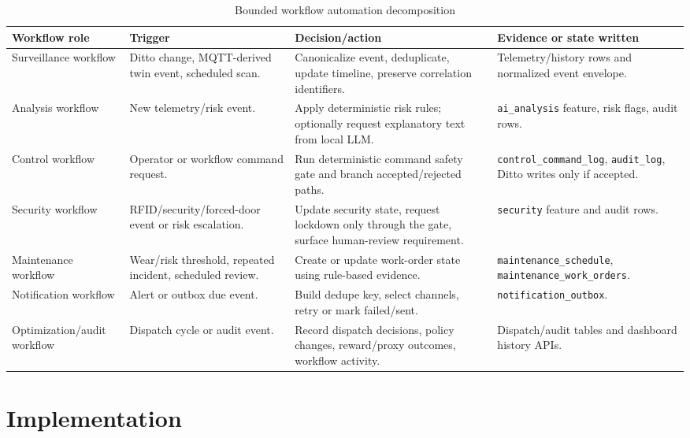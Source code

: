 \documentclass[journal]{IEEEtran}
\newcommand{\toprule}{\hline}
\newcommand{\midrule}{\hline}
\newcommand{\bottomrule}{\hline}
\newcommand{\artifact}[1]{\texttt{#1}}
\begin{document}
\begin{table}[t]
\caption{Bounded workflow automation decomposition}
\label{tab:agent-workflows}
\centering
\footnotesize
\begin{tabularx}{\textwidth}{@{}p{}p{}Yp{0.18\textwidth}@{}}
\toprule
Workflow role & Trigger & Decision/action & Evidence or state written \\
\midrule
Surveillance workflow & Ditto change, MQTT-derived twin event, scheduled scan. & Canonicalize event, deduplicate, update timeline, preserve correlation identifiers. & Telemetry/history rows and normalized event envelope. \\
Analysis workflow & New telemetry/risk event. & Apply deterministic risk rules; optionally request explanatory text from local LLM. & \artifact{ai\_analysis} feature, risk flags, audit rows. \\
Control workflow & Operator or workflow command request. & Run deterministic command safety gate and branch accepted/rejected paths. & \artifact{control\_\allowbreak command\_\allowbreak log}, \artifact{audit\_log}, Ditto writes only if accepted. \\
Security workflow & RFID/security/forced-door event or risk escalation. & Update security state, request lockdown only through the gate, surface human-review requirement. & \artifact{security} feature and audit rows. \\
Maintenance workflow & Wear/risk threshold, repeated incident, scheduled review. & Create or update work-order state using rule-based evidence. & \artifact{maintenance\_\allowbreak schedule}, \artifact{maintenance\_\allowbreak work\_\allowbreak orders}. \\
Notification workflow & Alert or outbox due event. & Build dedupe key, select channels, retry or mark failed/sent. & \artifact{notification\_\allowbreak outbox}. \\
Optimization\slash audit \mbox{workflow} & Dispatch cycle or audit event. & Record dispatch decisions, policy changes, reward/proxy outcomes, workflow activity. & Dispatch/audit tables and dashboard history APIs. \\
\bottomrule
\end{tabularx}
\end{table}

\section{Implementation}
\end{document}
